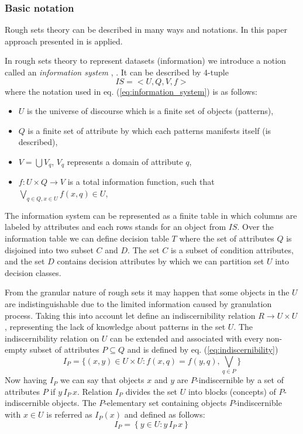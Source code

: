 \subsubsection{Basic notation}
\label{cha:Rough_set_basic_notation}
Rough sets theory can be described in many ways and notations. In this paper
approach presented in \cite{bib49} is applied. 

In rough sets theory to represent datasets (information) we introduce a notion 
called an \textit{information system} \cite{bib37}, \cite{bib39}. 
It can be described by 4-tuple
\begin{equation}
    IS = <U, Q, V, f >
    \label{eq:information_system}
\end{equation}
where the notation used in eq. (\ref{eq:information_system}) is as follows:
\begin{itemize}
    \item $U$ is the universe of discourse  which is a finite set of objects
        (patterns),
    \item $Q$ is a finite set of attribute by  which each patterns manifests
        itself (is described),
    \item $V = \bigcup V_q$, $V_q$ represents a domain of attribute $q$,
    \item $f:U \times Q \rightarrow V$ is a total information function, such that
        $\bigvee_{q\in Q, x \in U} f(x,q) \in U$,
\end{itemize} 
The information system can be represented as a finite table in which 
columns are labeled by attributes and each rows stands for an object from
$IS$. Over the information table we can define decision table
$T$ where the set of attributes $Q$ is disjoined into two
subset $C$ and $D$. The set $C$ is a subset of 
condition attributes, and the set $D$ contains decision attributes 
by which we can partition set $U$ into decision classes.

From the granular nature of rough sets it may happen that some objects 
in the $U$ are indistinguishable due to the limited information caused by
granulation process. Taking this into account let define an indiscernibility
relation $R \rightarrow U \times U$, representing the 
lack of knowledge about patterns in the set $U$. The indiscernibility relation on
$U$ can be extended and associated with every non-empty subset of attributes $P \subseteq Q$
and is defined by eq. (\ref{eq:indiscernibility})
\begin{equation} 
    I_P = \{ (x, y) \in U \times U: f(x, q) = f(y,q), \bigvee_{q \in P}\}
    \label{eq:indiscernibility}
\end{equation}
Now having $I_P$ we can say that objects $x$ and
$y$ are $P$-indiscernible by a set of attributes $P$ if $y \, I_P \, x$. Relation
$I_P$ divides the set $U$ into blocks (concepts) of $P$-indiscernible objects.
The $P$-elementary set containing objects $P$-indiscernible with $x \in U$ is
referred as $I_P(x)$ and defined as follows:
\begin{equation} 
    I_P = \left\{ y \in U: y \, I_P \, x \right\}
    \label{eq:p_indiscernible}
\end{equation}

